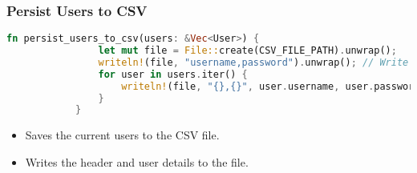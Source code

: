 \documentclass[aspectratio=169, table]{beamer}
\begin{document}
	\begin{frame}[fragile]
		\frametitle{Persist Users to CSV}
		\begin{lstlisting}[language=Rust]
			fn persist_users_to_csv(users: &Vec<User>) {
				let mut file = File::create(CSV_FILE_PATH).unwrap();
				writeln!(file, "username,password").unwrap(); // Write the header
				for user in users.iter() {
					writeln!(file, "{},{}", user.username, user.password).unwrap();
				}
			}
		\end{lstlisting}
		\begin{itemize}
			\item Saves the current users to the CSV file.
			\item Writes the header and user details to the file.
		\end{itemize}
	\end{frame}
	
\end{document}
